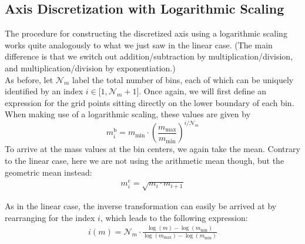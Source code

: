  
    \subsection{Axis Discretization with Logarithmic Scaling}
    \label{subsec:axis_discretization_with_logarithmic_scale}

        The procedure for constructing the discretized axis using a logarithmic scaling works quite
        analogously to what we just saw in the linear case. (The main difference is that we switch
        out addition/subtraction by multiplication/division, and multiplication/division by
        exponentiation.)
        \\

        As before, let $\mathcal N_m$ label the total number of bins, each of which can be uniquely 
        identified by an index $i\in\mathcal[1,\mathcal N_m+1]$. Once again, we will first define 
        an expression for the grid points sitting directly on the lower boundary of each bin. When
        making use of a logarithmic scaling, these values are given by
        \begin{equation}
            m_i^\text{b}
                =m_\text{min}\cdot\left(\frac{m_\text{max}}{m_\text{min}}\right)^{i/\mathcal N_m}
        \end{equation}
        To arrive at the mass values at the bin centers, we again take the mean. Contrary to the 
        linear case, here we are not using the arithmetic mean though, but the geometric mean
        instead:
        \begin{align}
            m_i^\text{c}
                =\sqrt{m_i\cdot m_{i+1}}
        \end{align}
    
        As in the linear case, the inverse transformation can easily be arrived at by rearranging
        for the index $i$, which leads to the following expression:
        \begin{align}
            i(m) = \mathcal N_m\cdot \frac{
                \log(m)-\log(m_\text{min})
            }{
                \log(m_\text{max})-\log(m_\text{min})
            }
        \end{align}
        

